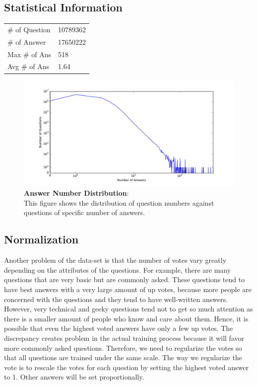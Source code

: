 \documentclass[11pt]{article}
\begin{document}
\subsection{Statistical Information}
\begin{table}[H]
\centering
\begin{tabular}{ll}
\# of Question & 10789362  \\
\# of Answer   & 17650222 \\
Max \# of Ans  & 518      \\
Avg \# of Ans  & 1.64     
\end{tabular}
\end{table}

\begin{figure}[H]
\includegraphics[width=0.98\columnwidth]{dataset_stat.pdf}
\caption{\textbf{Answer Number Distribution}: \\ This figure shows the distribution of question numbers against questions of specific number of answers. }
\label{fig_a}
\end{figure}
\subsection{Normalization}
Another problem of the data-set is that the number of votes vary greatly depending on the attributes of the questions. For example, there are many questions that are very basic but are commonly asked. These questions tend to have best answers with a very large amount of up votes, because more people are concerned with the questions and they tend to have well-written answers. However, very technical and geeky questions tend not to get so much attention as there is a smaller amount of people who know and care about them. Hence, it is possible that even the highest voted answers have only a few up votes. The discrepancy creates problem in the actual training process because it will favor more commonly asked questions. Therefore, we need to regularize the votes so that all questions are trained under the same scale. The way we regularize the vote is to rescale the votes for each question by setting the highest voted answer to 1. Other answers will be set proportionally. 
\end{document}
